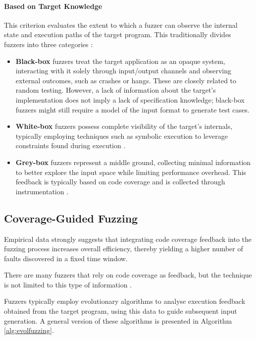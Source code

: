 \paragraph{Based on Target Knowledge} This criterion evaluates the extent to which a fuzzer can observe the internal state and execution paths of the target program. This traditionally divides fuzzers into three categories \cite{liang2018fuzzing}:
\begin{itemize}
    \item \textbf{Black-box} fuzzers treat the target application as an opaque system, interacting with it solely through input/output channels and observing external outcomes, such as crashes or hangs. These are closely related to random testing. However, a lack of information about the target's implementation does not imply a lack of specification knowledge; black-box fuzzers might still require a model of the input format to generate test cases.

    \item \textbf{White-box} fuzzers possess complete visibility of the target's internals, typically employing techniques such as symbolic execution to leverage constraints found during execution \cite{godefroid2008automated}.

    \item \textbf{Grey-box} fuzzers represent a middle ground, collecting minimal information to better explore the input space while limiting performance overhead. This feedback is typically based on code coverage and is collected through instrumentation \cite{zalewski2014afltech}.
\end{itemize}

\subsection{Coverage-Guided Fuzzing}

Empirical data \cite{ossfuzz} strongly suggests that integrating code coverage feedback into the fuzzing process increases overall efficiency, thereby yielding a higher number of faults discovered in a fixed time window.

There are many fuzzers that rely on code coverage as feedback, but the technique is not limited to this type of information \cite{aschermann2020ijon, wang2019sensitive}.

Fuzzers typically employ evolutionary algorithms to analyse execution feedback obtained from the target program, using this data to guide subsequent input generation. A general version of these algorithms is presented in Algorithm \ref{alg:evolfuzzing}.

